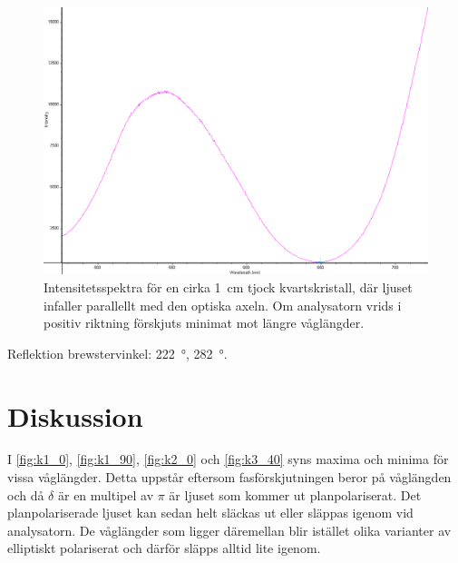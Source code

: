 \documentclass[a4paper]{article}
\begin{document}
\FloatBarrier
\begin{figure}[ht!]
	\centering
	\includegraphics[width=\linewidth]{data/spektra_aktiv2_inv}
	\caption{Intensitetsspektra för en cirka \SI{1}{\centi\m} tjock kvartskristall, där ljuset infaller parallellt med den optiska axeln. Om analysatorn vrids i positiv riktning förskjuts minimat mot längre våglängder.}
	\label{fig:aktiv3}
\end{figure}
\FloatBarrier

Reflektion brewstervinkel: \SI{222}{\degree}, \SI{282}{\degree}.

\section{Diskussion}



I \autoref{fig:k1_0}, \autoref{fig:k1_90}, \autoref{fig:k2_0} och \autoref{fig:k3_40} syns maxima och minima för vissa våglängder. Detta uppstår eftersom fasförskjutningen beror på våglängden och då $\delta$ är en multipel av $\pi$ är ljuset som kommer ut planpolariserat. Det planpolariserade ljuset kan sedan helt släckas ut eller släppas igenom vid analysatorn. De våglängder som ligger däremellan blir istället olika varianter av elliptiskt polariserat och därför släpps alltid lite igenom.


\end{document}

